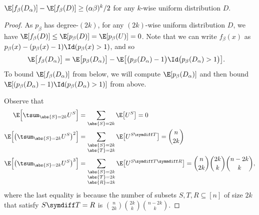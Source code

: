   \begin{claim} \label{claim:OZ-distinguish}
    $\E[f_\beta(D_\alpha)] - \E[f_\beta(D)] \ge (\alpha \beta)^k/2$ for any $k$-wise uniform distribution $D$.
  \end{claim}

  \begin{proof}
    As $p_\beta$ has degree-$(2k)$, for any $(2k)$-wise uniform distribution $D$, we have $\E[f_\beta(D)] \le \E[p_\beta(D)] = \E[p_\beta(U)] = 0$.
    Note that we can write $f_\beta(x)$ as $p_\beta(x) - (p_\beta(x)-1)\Id(p_\beta(x) > 1)$, and so
    \begin{align}
      \E\bigl[f_\beta(D_\alpha)\bigr]
      &= \E\bigl[p_\beta(D_\alpha)\bigr] - \E\bigl[\bigl(p_\beta(D_\alpha)-1\bigr) \Id\bigl(p_\beta(D_\alpha) > 1\bigr) \bigr] \label{eq:OZ-goal} .
    \end{align}
    To bound $\E[f_\beta(D_\alpha)]$ from below, we will compute $\E[p_\beta(D_\alpha)]$ and then bound $\E[(p_\beta(D_\alpha)-1) \Id(p_\beta(D_\alpha) > 1)]$ from above.

    Observe that
    \begin{align*}
    \E\Bigl[ \tsum_{\abs{S}=2k} U^S \Bigr]
    &= \sum_{\abs{S}=2k} \E\bigl [U^S \bigr] = 0 \\
    \E\Bigl[ \bigl(\tsum_{\abs{S}=2k} U^S\bigr)^2 \Bigr]
    &= \sum_{\substack{\abs{S}=2k \\ \abs{T}=2k}} \E\bigl[U^{S \symdiff T}\bigr]
    = \binom{n}{2k} \\
    \E\Bigl[ \bigl(\tsum_{\abs{S}=2k} U^S\bigr)^3 \Bigr]
    &= \sum_{\substack{\abs{S}=2k\\ \abs{T}=2k\\ \abs{R}=2k}} \E\bigl[U^{S \symdiff T \symmdiff R}\bigr]
    = \binom{n}{2k}\binom{2k}{k}\binom{n-2k}{k} ,
    \end{align*}
    where the last equality is because the number of subsets $S,T,R \subseteq [n]$ of size $2k$ that satisfy $S \symdiff T = R$ is $\binom{n}{2k}\binom{2k}{k}\binom{n-2k}{k}$.
    

\end{proof}
